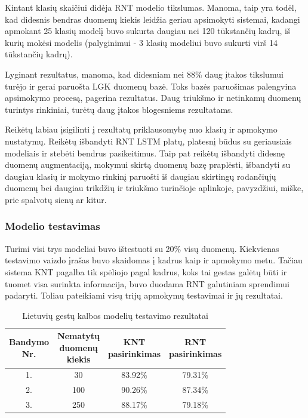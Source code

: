 \documentclass{VUMIFPSbakalaurinis}
\begin{document}
Kintant klasių skaičiui didėja RNT modelio tikslumas. Manoma, taip yra todėl, kad didesnis bendras duomenų kiekis leidžia geriau apsimokyti sistemai, kadangi apmokant 25 klasių modelį buvo sukurta daugiau nei 120 tūkstančių kadrų, iš kurių mokėsi modelis (palyginimui - 3 klasių modeliui buvo sukurti virš 14 tūkstančių kadrų). 

Lyginant rezultatus, manoma, kad didesniam nei 88\% daug įtakos tikslumui turėjo ir gerai paruošta LGK duomenų bazė. Toks bazės paruošimas palengvina apsimokymo procesą, pagerina rezultatus. Daug triukšmo ir netinkamų duomenų turintys rinkiniai, turėtų daug įtakos blogesniems rezultatams.

Reikėtų labiau įsigilinti į rezultatų priklausomybę nuo klasių ir apmokymo nustatymų. Reikėtų išbandyti RNT LSTM platų, platesnį būdus su geriausiais modeliais ir stebėti bendrus pasikeitimus. Taip pat reikėtų išbandyti didesnę duomenų augmentaciją, mokymui skirtą duomenų bazę praplėsti, išbandyti su daugiau klasių ir mokymo rinkinį paruošti iš daugiau skirtingų rodančiųjų duomenų bei daugiau trikdžių ir triukšmo turinčioje aplinkoje, pavyzdžiui, miške, prie spalvotų sienų ar kitur.

\subsubsection{Modelio testavimas}

Turimi visi trys modeliai buvo ištestuoti su 20\% visų duomenų. Kiekvienas testavimo vaizdo įrašas buvo skaidomas į kadrus kaip ir apmokymo metu. Tačiau sistema KNT pagalba tik spėliojo pagal kadrus, koks tai gestas galėtų būti ir tuomet visa surinkta informacija, buvo duodama RNT galutiniam sprendimui padaryti. Toliau pateikiami visų trijų apmokymų testavimai ir jų rezultatai.

\begin{table}[H]\footnotesize
	\centering
	\caption{Lietuvių gestų kalbos modelių testavimo rezultatai}
	{\begin{tabular}{| c | c | c | c |}
		\hline
		\thead{Bandymo\\Nr.} & \thead{Nematytų\\duomenų\\kiekis} & \thead{KNT\\pasirinkimas}  & \thead{RNT\\pasirinkimas}  \\
		\hline
		1. & 30 & 83.92\% & 79.31\% \\
		\hline
		2. & 100  & 90.26\% & 87.34\% \\
		\hline
		3. & 250 & 88.17\% & 79.18\% \\
		\hline
	\end{tabular}}
	\label{tab:lgk-testavimas}
\end{table}
\end{document}
